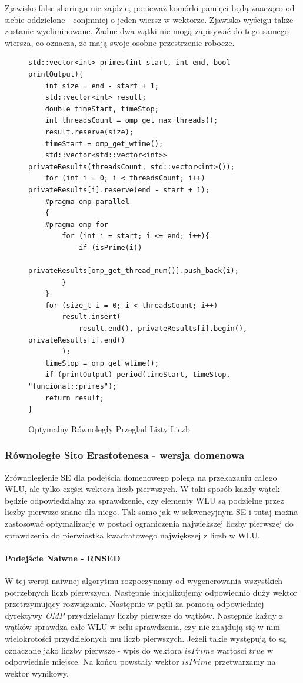 \documentclass{article}
\begin{document}
                    Zjawisko false sharingu nie zajdzie, ponieważ komórki pamięci będą znacząco od siebie oddzielone - conjmniej o jeden wiersz w wektorze. Zjawisko wyścigu także zostanie wyeliminowane. Żadne dwa wątki nie mogą zapisywać do tego samego wiersza, co oznacza, że mają swoje osobne przestrzenie robocze.
                \begin{figure}[H]
                    \begin{verbatim}
std::vector<int> primes(int start, int end, bool printOutput){
    int size = end - start + 1;
    std::vector<int> result;
    double timeStart, timeStop;
    int threadsCount = omp_get_max_threads();
    result.reserve(size);
    timeStart = omp_get_wtime();
    std::vector<std::vector<int>> privateResults(threadsCount, std::vector<int>());
    for (int i = 0; i < threadsCount; i++) privateResults[i].reserve(end - start + 1);
    #pragma omp parallel
    {
    #pragma omp for
        for (int i = start; i <= end; i++){
            if (isPrime(i))
                privateResults[omp_get_thread_num()].push_back(i);
        }
    }
    for (size_t i = 0; i < threadsCount; i++)
        result.insert(
            result.end(), privateResults[i].begin(), privateResults[i].end()
        );
    timeStop = omp_get_wtime();
    if (printOutput) period(timeStart, timeStop, "funcional::primes");
    return result;
}
                    \end{verbatim}
                    \caption{Optymalny Równoległy Przegląd Listy Liczb}
                \end{figure}
                
                
            \subsubsection{Równoległe Sito Erastotenesa - wersja domenowa}
                Zrównoleglenie \gls{SE} dla podejścia domenowego polega na przekazaniu całego \gls{WLU}, ale tylko części wektora liczb pierwszych. W taki sposób każdy wątek będzie odpowiedzialny za sprawdzenie, czy elementy \gls{WLU} są podzielne przez liczby pierwsze znane dla niego. Tak samo jak w sekwencyjnym \gls{SE} i tutaj można zastosować optymalizację w postaci ograniczenia największej liczby pierwszej do sprawdzenia do pierwiastka kwadratowego największej z liczb w \gls{WLU}.
                
                \paragraph{Podejście Naiwne - \gls{RNSED}}
                    W tej wersji naiwnej algorytmu rozpoczynamy od wygenerowania wszystkich potrzebnych liczb pierwszych. Następnie inicjalizujemy odpowiednio duży wektor przetrzymujący rozwiązanie. Następnie w pętli za pomocą odpowiedniej dyrektywy \emph{OMP} przydzielamy liczby pierwsze do wątków. Następnie każdy z wątków sprawdza całe \gls{WLU} w celu sprawdzenia, czy nie znajdują się w nim wielokrotości przydzielonych mu liczb pierwszych. Jeżeli takie występują to są oznaczane jako liczby pierwsze - wpis do wektora $isPrime$ wartości $true$ w odpowiednie miejsce. Na końcu powstały wektor $isPrime$ przetwarzamy na wektor wynikowy.
                    
\end{document}
